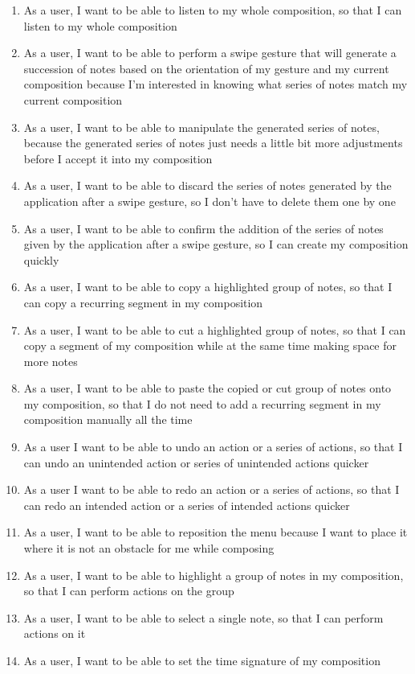 \begin{enumerate}
\item As a user, I want to be able to listen to my whole composition, so that I can listen to my whole composition
\item As a user, I want to be able to perform a swipe gesture that will generate a succession of notes based on the orientation of my gesture and my current composition because I'm interested in knowing what series of notes match my current composition
\item As a user, I want to be able to manipulate the generated series of notes, because the generated series of notes just needs a little bit more adjustments before I accept it into my composition
\item As a user, I want to be able to discard the series of notes generated by the application after a swipe gesture, so I don't have to delete them one by one
\item As a user, I want to be able to confirm the addition of the series of notes given by the application after a swipe gesture, so I can create my composition quickly
\item As a user, I want to be able to copy a highlighted group of notes, so that I can copy a recurring segment in my composition
\item As a user, I want to be able to cut a highlighted group of notes, so that I can copy a segment of my composition while at the same time making space for more notes
\item As a user, I want to be able to paste the copied or cut group of notes onto my composition, so that I do not need to add a recurring segment in my composition manually all the time
\item As a user I want to be able to undo an action or a series of actions, so that I can undo an unintended action or series of unintended actions quicker
\item As a user I want to be able to redo an action or a series of actions, so that I can redo an intended action or a series of intended actions quicker
\item As a user, I want to be able to reposition the menu because I want to place it where it is not an obstacle for me while composing
\item As a user, I want to be able to highlight a group of notes in my composition, so that I can perform actions on the group
\item As a user, I want to be able to select a single note, so that I can perform actions on it
\item As a user, I want to be able to set the time signature of my composition

\end{enumerate}
